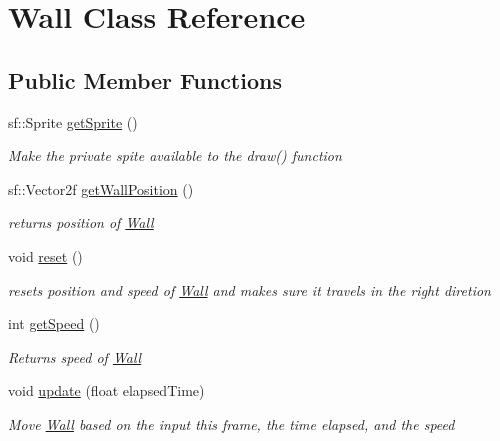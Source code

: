 \hypertarget{class_wall}{}\section{Wall Class Reference}
\label{class_wall}
\subsection*{Public Member Functions}
\begin{DoxyCompactItemize}
\item 
sf\+::\+Sprite \mbox{\hyperlink{class_wall_aadfad87e486dda5bb3ebc9e76f3a5a25}{get\+Sprite}} ()
\begin{DoxyCompactList}\small\item\em Make the private spite available to the draw() function \end{DoxyCompactList}\item 
sf\+::\+Vector2f \mbox{\hyperlink{class_wall_a6c8d0a1ea3c60112f0394db01ee0b62d}{get\+Wall\+Position}} ()
\begin{DoxyCompactList}\small\item\em returns position of \mbox{\hyperlink{class_wall}{Wall}} \end{DoxyCompactList}\item 
void \mbox{\hyperlink{class_wall_a640f88f221f37e8188ec7f2bf28c1ae8}{reset}} ()
\begin{DoxyCompactList}\small\item\em resets position and speed of \mbox{\hyperlink{class_wall}{Wall}} and makes sure it travels in the right diretion \end{DoxyCompactList}\item 
int \mbox{\hyperlink{class_wall_a8641042afcc4d4279cf972d9fe1518bc}{get\+Speed}} ()
\begin{DoxyCompactList}\small\item\em Returns speed of \mbox{\hyperlink{class_wall}{Wall}} \end{DoxyCompactList}\item 
void \mbox{\hyperlink{class_wall_ade8bc73e97c8237d0c44f041d51d8351}{update}} (float elapsed\+Time)
\begin{DoxyCompactList}\small\item\em Move \mbox{\hyperlink{class_wall}{Wall}} based on the input this frame, the time elapsed, and the speed \end{DoxyCompactList}\end{DoxyCompactItemize}
